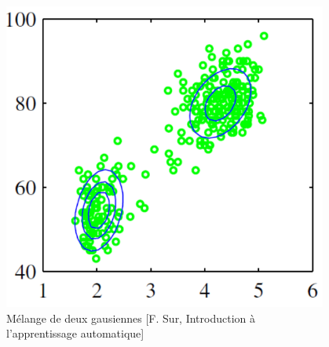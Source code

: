 \documentclass{presentation_template}
\begin{document}
\begin{frame}
\begin{columns}
\begin{column}{0.7\textwidth}
    \end{column}
    \begin{column}{0.3\textwidth}  %
        \vspace{-0.5cm}
        \begin{figure}
            \includegraphics[width=\textwidth]{Figures/mix_gaussienne.png}
            \caption{\tiny Mélange de deux gausiennes [F. Sur, Introduction à l'apprentissage automatique]}
        \end{figure}
    \end{column}
\end{columns}

\end{frame}

        
\end{document}
